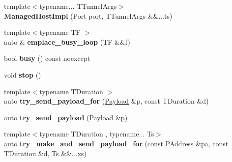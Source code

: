 \begin{DoxyCompactItemize}
\item 
\hypertarget{classnl_1_1ManagedHostImpl_aef1cdf80463dd1a9690ef03e088c1d66}{}{\footnotesize template$<$typename... T\+Tunnel\+Args$>$ }\\{\bfseries Managed\+Host\+Impl} (Port port, T\+Tunnel\+Args \&\&...ts)\label{classnl_1_1ManagedHostImpl_aef1cdf80463dd1a9690ef03e088c1d66}

\item 
\hypertarget{classnl_1_1ManagedHostImpl_a626bc07441217d08e475560869d7a023}{}{\footnotesize template$<$typename T\+F $>$ }\\auto \& {\bfseries emplace\+\_\+busy\+\_\+loop} (T\+F \&\&f)\label{classnl_1_1ManagedHostImpl_a626bc07441217d08e475560869d7a023}

\item 
\hypertarget{classnl_1_1ManagedHostImpl_ac412d63b60ee98d9c14da8c6688a1712}{}bool {\bfseries busy} () const  noexcept\label{classnl_1_1ManagedHostImpl_ac412d63b60ee98d9c14da8c6688a1712}

\item 
\hypertarget{classnl_1_1ManagedHostImpl_a202ff37cc7bcc9d7711361ccf50ec3bc}{}void {\bfseries stop} ()\label{classnl_1_1ManagedHostImpl_a202ff37cc7bcc9d7711361ccf50ec3bc}

\item 
\hypertarget{classnl_1_1ManagedHostImpl_a94ead799412e023175e9fbadf5251e9c}{}{\footnotesize template$<$typename T\+Duration $>$ }\\auto {\bfseries try\+\_\+send\+\_\+payload\+\_\+for} (\hyperlink{structnl_1_1Payload}{Payload} \&p, const T\+Duration \&d)\label{classnl_1_1ManagedHostImpl_a94ead799412e023175e9fbadf5251e9c}

\item 
\hypertarget{classnl_1_1ManagedHostImpl_affcbc6cb0fba53b4a388ef256008a7d2}{}auto {\bfseries try\+\_\+send\+\_\+payload} (\hyperlink{structnl_1_1Payload}{Payload} \&p)\label{classnl_1_1ManagedHostImpl_affcbc6cb0fba53b4a388ef256008a7d2}

\item 
\hypertarget{classnl_1_1ManagedHostImpl_a6436ffecc416447858a378d10a2f4653}{}{\footnotesize template$<$typename T\+Duration , typename... Ts$>$ }\\auto {\bfseries try\+\_\+make\+\_\+and\+\_\+send\+\_\+payload\+\_\+for} (const \hyperlink{structnl_1_1PAddress}{P\+Address} \&pa, const T\+Duration \&d, Ts \&\&...xs)\label{classnl_1_1ManagedHostImpl_a6436ffecc416447858a378d10a2f4653}


\end{DoxyCompactItemize}
